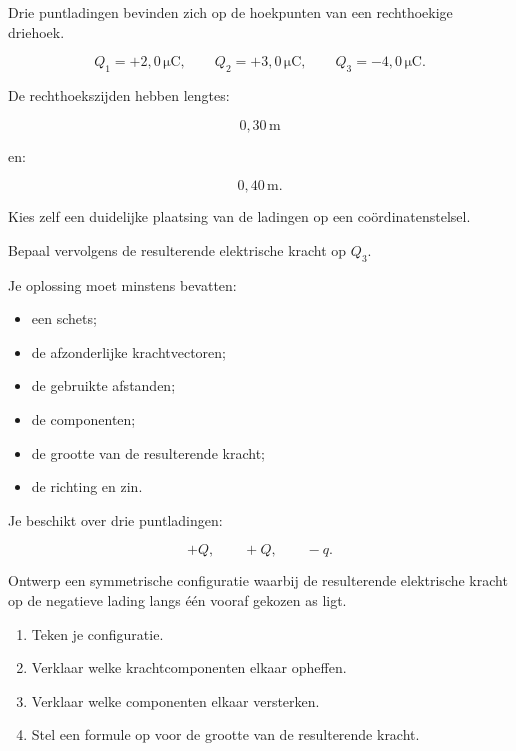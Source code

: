 \documentclass{ximera}
\begin{document}
\begin{oefening}{\oefG}

Drie puntladingen bevinden zich op de hoekpunten van een rechthoekige
driehoek.

\[
Q_1=+2{,}0\,\mathrm{\mu C},
\qquad
Q_2=+3{,}0\,\mathrm{\mu C},
\qquad
Q_3=-4{,}0\,\mathrm{\mu C}.
\]

De rechthoekszijden hebben lengtes:

\[
0{,}30\,\mathrm m
\]

en:

\[
0{,}40\,\mathrm m.
\]

Kies zelf een duidelijke plaatsing van de ladingen op een
coördinatenstelsel.

Bepaal vervolgens de resulterende elektrische kracht op $Q_3$.

Je oplossing moet minstens bevatten:

\begin{itemize}
  \item een schets;
  \item de afzonderlijke krachtvectoren;
  \item de gebruikte afstanden;
  \item de componenten;
  \item de grootte van de resulterende kracht;
  \item de richting en zin.
\end{itemize}

\end{oefening}


\begin{oefening}{\oefG}

Je beschikt over drie puntladingen:

\[
+Q,\qquad +Q,\qquad -q.
\]

Ontwerp een symmetrische configuratie waarbij de resulterende
elektrische kracht op de negatieve lading langs één vooraf gekozen as
ligt.

\begin{enumerate}
  \item Teken je configuratie.
  \item Verklaar welke krachtcomponenten elkaar opheffen.
  \item Verklaar welke componenten elkaar versterken.
  \item Stel een formule op voor de grootte van de resulterende kracht.
\end{enumerate}

\end{oefening}
\end{document}
